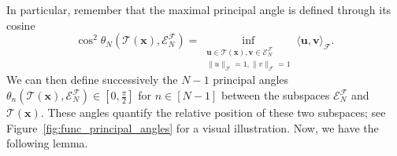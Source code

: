 \documentclass[twoside,11pt]{book}
\numberwithin{theorem}{chapter}
\numberwithin{definition}{chapter}
\numberwithin{proposition}{chapter}
\numberwithin{corollary}{chapter}
\numberwithin{example}{chapter}
\numberwithin{lemma}{chapter}
\numberwithin{assumption}{chapter}
\numberwithin{equation}{chapter}
\numberwithin{figure}{chapter}
\newcommand{\ab}[1]{\textcolor{red}{#1}}
\begin{document}
In particular, remember that the maximal principal angle is defined through its cosine
\begin{equation}
	\cos^{2} \theta_{N}(\mathcal{T}(\bm{x}),\mathcal{E}^{\mathcal{F}}_{N}) = \inf\limits_{\substack{\bm{u} \in \mathcal{T}(\bm{x}), \bm{v} \in \mathcal{E}^{\mathcal{F}}_{N}\\ \|u\|_{\mathcal{F}} = 1, \|v\|_{\mathcal{F}} = 1}} \langle \bm{u}, \bm{v} \rangle_{\mathcal{F}}.
\end{equation}
We can then define successively the $N-1$ principal angles $\theta_{n}(\mathcal{T}(\bm{x}),\mathcal{E}^{\mathcal{F}}_{N}) \in \left[0, \frac{\pi}{2}\right]$ for $ n\in [N-1]$ between the subspaces $\mathcal{E}^{\mathcal{F}}_{N}$ and $\mathcal{T}(\bm{x})$. These angles quantify the relative position of these two subspaces; see Figure~\ref{fig:func_principal_angles} for a visual illustration. Now, we have the following lemma.






\end{document}
